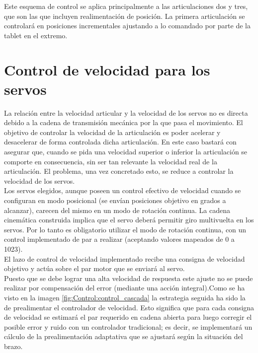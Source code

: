 Este esquema de control se aplica principalmente a las articulaciones dos y tres, que son las que incluyen realimentación de posición. La primera articulación se controlará en posiciones incrementales ajustando a lo comandado por parte de la tablet en el extremo.

\section{Control de velocidad para los servos} \label{sec:Control:velocidad_g15}

La relación entre la velocidad articular y la velocidad de los servos no es directa debido a la cadena de transmisión mecánica por la que pasa el movimiento. El objetivo de controlar la velocidad de la articulación es poder acelerar y desacelerar de forma controlada dicha articulación. En este caso bastará con asegurar que, cuando se pida una velocidad superior o inferior la articulación se comporte en consecuencia, sin ser tan relevante la velocidad real de la articulación. El problema, una vez concretado esto, se reduce a controlar la velocidad de los servos.
\\

Los servos elegidos, aunque poseen un control efectivo de velocidad cuando se configuran en modo posicional (se envían posiciones objetivo en grados a alcanzar), carecen del mismo en un modo de rotación continua. La cadena cinemática construida implica que el servo deberá permitir giro multivuelta en los servos. Por lo tanto es obligatorio utilizar el modo de rotación continua, con un control implementado de par a realizar (aceptando valores mapeados de 0 a 1023).
\\

El lazo de control de velocidad implementado recibe una consigna de velocidad objetivo y actúa sobre el par motor que se enviará al servo.
\\

Puesto que se debe lograr una alta velocidad de respuesta este ajuste no se puede realizar por compensación del error (mediante una acción integral).Como se ha visto en la imagen \ref{fig:Control:control_cascada} la estrategia seguida ha sido la de prealimentar el controlador de velocidad. Esto significa que para cada consigna de velocidad se estimará el par requerido en cadena abierta para luego corregir el posible error y ruido con un controlador tradicional; es decir, se implementará un cálculo de la prealimentación adaptativa que se ajustará según la situación del brazo.
\\

